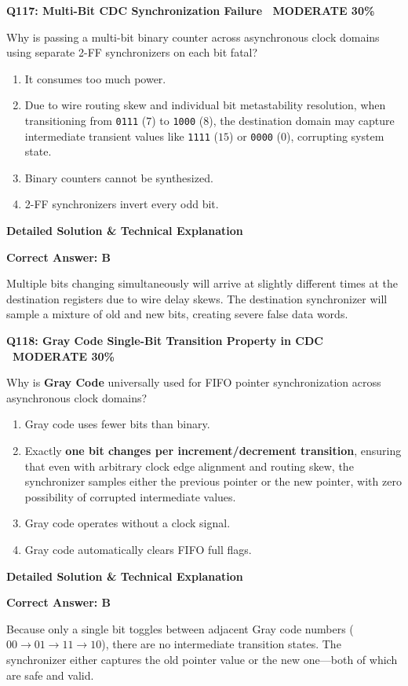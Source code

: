 \documentclass[11pt,a4paper]{article}
\newcommand{\badgemod}{{\color{white}\colorbox{modoran}{\bfseries\sffamily\tiny\ MODERATE 30\%\ }}}
\newenvironment{qbox}[2]{%
  \begin{mdframed}[style=qstyle]%
  {\bfseries\sffamily\color{primaryblue}#1 \hfill #2}\par\vspace{2pt}%
}{%
  \end{mdframed}%
}
\newenvironment{ansbox}{%
  \begin{mdframed}[style=ansstyle]%
  {\bfseries\sffamily\color{ansgreen}\small Detailed Solution \& Technical Explanation}\par\vspace{2pt}\small%
}{%
  \end{mdframed}%
}
\begin{document}
\begin{qbox}{Q117: Multi-Bit CDC Synchronization Failure}{\badgemod}
Why is passing a multi-bit binary counter across asynchronous clock domains using separate 2-FF synchronizers on each bit fatal?
\begin{enumerate}[label=\textbf{\Alph*.}]
  \item It consumes too much power.
  \item Due to wire routing skew and individual bit metastability resolution, when transitioning from \texttt{0111} ($7$) to \texttt{1000} ($8$), the destination domain may capture intermediate transient values like \texttt{1111} ($15$) or \texttt{0000} ($0$), corrupting system state.
  \item Binary counters cannot be synthesized.
  \item 2-FF synchronizers invert every odd bit.
\end{enumerate}
\end{qbox}
\begin{ansbox}
\textbf{Correct Answer: B}

Multiple bits changing simultaneously will arrive at slightly different times at the destination registers due to wire delay skews. The destination synchronizer will sample a mixture of old and new bits, creating severe false data words.
\end{ansbox}

\begin{qbox}{Q118: Gray Code Single-Bit Transition Property in CDC}{\badgemod}
Why is \textbf{Gray Code} universally used for FIFO pointer synchronization across asynchronous clock domains?
\begin{enumerate}[label=\textbf{\Alph*.}]
  \item Gray code uses fewer bits than binary.
  \item Exactly \textbf{one bit changes per increment/decrement transition}, ensuring that even with arbitrary clock edge alignment and routing skew, the synchronizer samples either the previous pointer or the new pointer, with zero possibility of corrupted intermediate values.
  \item Gray code operates without a clock signal.
  \item Gray code automatically clears FIFO full flags.
\end{enumerate}
\end{qbox}
\begin{ansbox}
\textbf{Correct Answer: B}

Because only a single bit toggles between adjacent Gray code numbers ($00 \rightarrow 01 \rightarrow 11 \rightarrow 10$), there are no intermediate transition states. The synchronizer either captures the old pointer value or the new one---both of which are safe and valid.
\end{ansbox}
\end{document}
